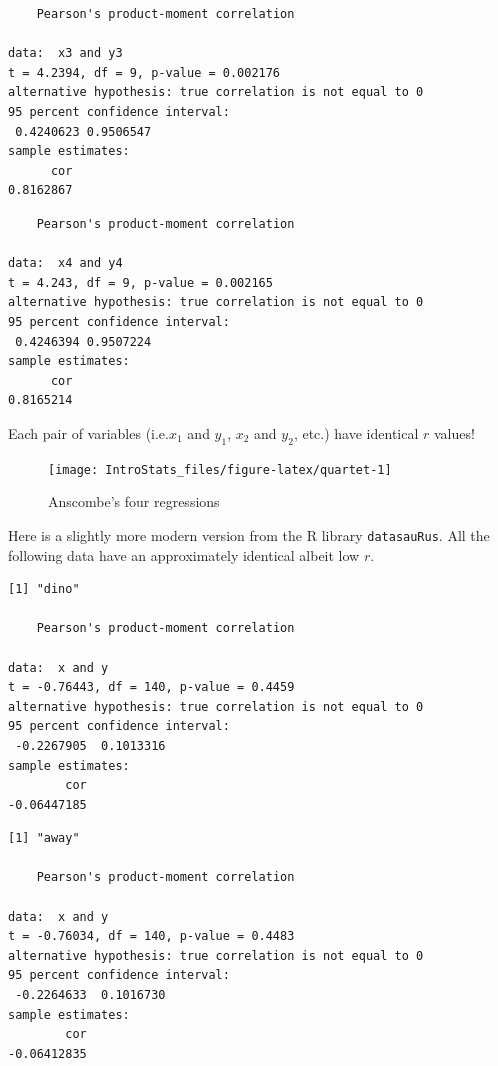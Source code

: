 \documentclass[
  oneside]{krantz}
\begin{document}
\begin{verbatim}
    Pearson's product-moment correlation

data:  x3 and y3
t = 4.2394, df = 9, p-value = 0.002176
alternative hypothesis: true correlation is not equal to 0
95 percent confidence interval:
 0.4240623 0.9506547
sample estimates:
      cor 
0.8162867 
\end{verbatim}

\begin{verbatim}
    Pearson's product-moment correlation

data:  x4 and y4
t = 4.243, df = 9, p-value = 0.002165
alternative hypothesis: true correlation is not equal to 0
95 percent confidence interval:
 0.4246394 0.9507224
sample estimates:
      cor 
0.8165214 
\end{verbatim}

Each pair of variables (i.e.\(x_1\) and \(y_1\), \(x_2\) and \(y_2\), etc.) have identical \(r\) values!

\begin{figure}

{\centering \texttt{[image: IntroStats\_files/figure-latex/quartet-1]} 

}

\caption{Anscombe's four regressions}\label{fig:quartet}
\end{figure}

Here is a slightly more modern version from the R library \texttt{datasauRus}. All the following data have an approximately identical albeit low \(r\).

\begin{verbatim}
[1] "dino"

    Pearson's product-moment correlation

data:  x and y
t = -0.76443, df = 140, p-value = 0.4459
alternative hypothesis: true correlation is not equal to 0
95 percent confidence interval:
 -0.2267905  0.1013316
sample estimates:
        cor 
-0.06447185 
\end{verbatim}

\begin{verbatim}
[1] "away"

    Pearson's product-moment correlation

data:  x and y
t = -0.76034, df = 140, p-value = 0.4483
alternative hypothesis: true correlation is not equal to 0
95 percent confidence interval:
 -0.2264633  0.1016730
sample estimates:
        cor 
-0.06412835 
\end{verbatim}
\end{document}
